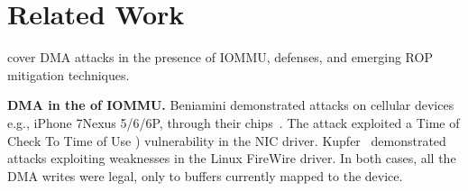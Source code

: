 \section{Related Work}
\DIFdelbegin {}\DIFdelend \DIFaddbegin {}\DIFaddend cover DMA attacks in the presence of IOMMU, defenses, and emerging ROP mitigation techniques.

\smallskip
\noindent\textbf{DMA \DIFdelbegin {}\DIFdelend \DIFaddbegin {}\DIFaddend in the \DIFdelbegin {}\DIFdelend \DIFaddbegin {}\DIFaddend of IOMMU.}
Beniamini demonstrated attacks on cellular devices \DIFdelbegin \DIFdel{, }\DIFdelend \DIFaddbegin \DIFadd{(}\DIFaddend e.g., \DIFdelbegin {}\DIFdelend iPhone 7\DIFdelbegin {}\DIFdelend \DIFaddbegin \DIFadd{, }\DIFaddend Nexus 5/6/6P\DIFaddbegin \DIFadd{)}\DIFaddend , through their \DIFdelbegin {}\DIFdelend \DIFaddbegin {}\DIFaddend chips~\cite{Ben17a, Ben17b}. 
The attack exploited a \DIFdelbegin {}\DIFdelend Time of Check To Time of Use \DIFaddbegin {}\DIFaddend ) vulnerability in the NIC driver. Kupfer~\cite{kupfer2018iommu} \DIFdelbegin {}\DIFdelend demonstrated \simple attacks exploiting weaknesses in the Linux FireWire driver. In both cases, all the DMA writes were legal, \DIFdelbegin {}\DIFdelend \DIFaddbegin {}\DIFaddend only to buffers currently mapped to the device.



